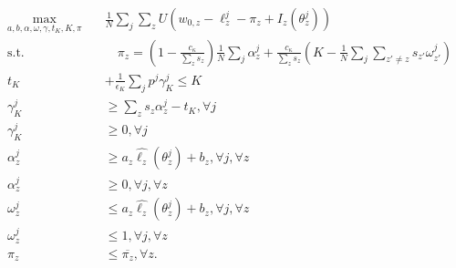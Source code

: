 \documentclass[12pt]{article}
\begin{document}
\begin{align*}
\max_{a,b,\alpha,\omega,\gamma,t_K,K,\pi} \quad & \frac{1}{N} \sum_j \sum_z U\left ( w_{0,z} -\ell_z^j -\pi_z + I_z(\theta^j_z) \right ) \\
\text{s.t.} &\quad \pi_z = \left (1-\frac{c_{\kappa}}{\sum_z s_z} \right ) \frac{1}{N} \sum_j \alpha^j_z + \frac{c_{\kappa}}{\sum_z s_z}  \left (K - \frac{1}{N} \sum_j \sum_{z' \neq z} s_{z'} \omega_{z'}^j \right )\\
t_K &+ \frac{1}{\epsilon_K} \sum_j p^j \gamma_K^j \leq K\\
\gamma_K^j &\geq \sum_z s_z \alpha^j_z -t_K, \forall j \\
\gamma_K^j &\geq 0, \forall j\\
\alpha^j_z &\geq a_z \hat{\ell_z}(\theta^j_z) + b_z, \forall j, \forall z\\
\alpha^j_z &\geq 0, \forall j, \forall z\\
\omega^j_z &\leq a_z \hat{\ell_z}(\theta^j_z) + b_z, \forall j, \forall z\\
\omega^j_z &\leq 1, \forall j, \forall z\\
\pi_z &\leq \overline{\pi_z}, \forall z.
\end{align*}


\end{document}

